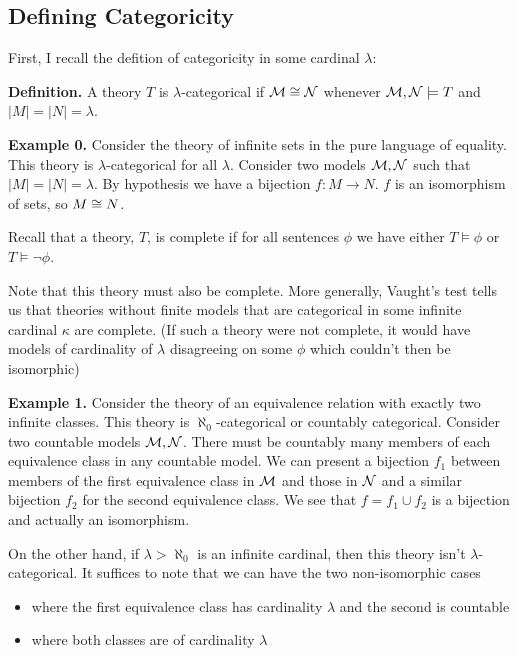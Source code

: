 \subsection{Defining Categoricity}

First, I recall the defition of categoricity in some cardinal \(\lambda\):

\textbf{Definition.} A theory \(T\) is \(\lambda\)-categorical if \(\mathcal{M} \cong \mathcal{N}\) whenever \(\mathcal{M}, \mathcal{N} \models T\) and \(|M| = |N| = \lambda\).

\textbf{Example 0.} Consider the theory of infinite sets in the pure language of equality. 
This theory is \(\lambda\)-categorical for all \(\lambda\).
Consider two models \(\mathcal{M}, \mathcal{N}\) such that \(|M|=|N|=\lambda\). 
By hypothesis we have a bijection \(f: M \to N\). \(f\) is an isomorphism of sets, so \(M \cong N\).

Recall that a theory, \(T\), is complete if for all sentences \(\phi\) we have either \(T \models \phi\) or \(T \models \neg \phi\). 

Note that this theory must also be complete. 
More generally, Vaught's test tells us that theories without finite models that are categorical in some infinite cardinal \(\kappa\) are complete. 
(If such a theory were not complete, it would have models of cardinality of \(\lambda\) disagreeing on some \(\phi\) which couldn't then be isomorphic)

\textbf{Example 1.} Consider the theory of an equivalence relation with exactly two infinite classes. 
This theory is \(\aleph_0\)-categorical or countably categorical. 
Consider two countable models \(\mathcal{M}, \mathcal{N}\). 
There must be countably many members of each equivalence class in any countable model. 
We can present a bijection \(f_1\) between members of the first equivalence class in  \(\mathcal{M}\) and those in \(\mathcal{N}\) and a similar bijection \(f_2\) for the second equivalence class. 
We see that \(f = f_1 \cup f_2\) is a bijection and actually an isomorphism. 

On the other hand, if \(\lambda > \aleph_0\) is an infinite cardinal, then this theory isn't \(\lambda\)-categorical. 
It suffices to note that we can have the two non-isomorphic cases 
\begin{itemize}
\item where the first equivalence class has cardinality \(\lambda\) and the second is countable 
\item where both classes are of cardinality \(\lambda\)
\end{itemize}

